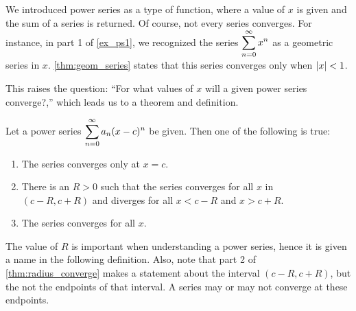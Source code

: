 We introduced power series as a type of function, where a value of $x$ is given and the sum of a series is returned. Of course, not every series converges. For instance, in part 1 of \autoref{ex_ps1}, we recognized the series $\displaystyle \sum_{n=0}^\infty x^n$ as a geometric series in $x$. \autoref{thm:geom_series} states that this series converges only when $\left\lvert x \right\rvert<1$. 

This raises the question: ``For what values of $x$ will a given power series converge?,'' which  leads us to a theorem and definition.

\begin{theorem}\label{thm:radius_converge}%
Let a power series $\displaystyle \sum_{n=0}^\infty a_n(x-c)^n$ be given. Then one of the following is true:
\begin{enumerate}
	\item The series converges only at $x=c$.
	\item	There is an $R>0$ such that the series converges for all $x$ in \\	
	$(c-R,c+R)$ and diverges for all $x<c-R$ and $x>c+R$.
	\item	The series converges for all $x$.
\end{enumerate}
\end{theorem}

	
The value of $R$ is important when understanding a power series, hence it is given a name in the following definition. Also, note that part 2 of \autoref{thm:radius_converge} makes a statement about the interval $(c-R,c+R)$, but the not the endpoints of that interval. A series may or may not converge at these endpoints.
	
